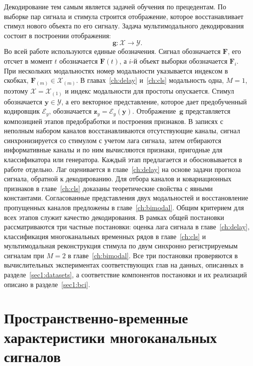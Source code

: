 Декодирование тем самым является задачей обучения по прецедентам. По выборке пар сигнала и стимула строится отображение, которое восстанавливает стимул нового объекта по его сигналу. Задача мультимодального декодирования состоит в построении отображения:
\begin{equation}\label{eq:decoding}
\mathbf{g}: \mathcal{X} \to \mathcal{Y}.
\end{equation}
Во всей работе используются единые обозначения. Сигнал обозначается $\mathbf{F}$, его отсчет в момент $t$ обозначается $\mathbf{F}(t)$, а $i$-й объект выборки обозначается $\mathbf{F}_i$. При нескольких модальностях номер модальности указывается индексом в скобках, $\mathbf{F}_{(m)} \in \mathcal{X}_{(m)}$. В главах~\ref{ch:delay} и~\ref{ch:cls} модальность одна, $M = 1$, поэтому $\mathcal{X} = \mathcal{X}_{(1)}$ и индекс модальности для простоты опускается. Стимул обозначается $\mathbf{y} \in \mathcal{Y}$, а его векторное представление, которое дает предобученный кодировщик $\mathcal{E}_y$, обозначается $\mathbf{z}_y = \mathcal{E}_y(\mathbf{y})$.
Отображение~$\mathbf{g}$ представляется композицией этапов предобработки и построения признаков. В записях с неполным набором каналов восстанавливаются отсутствующие каналы, сигнал синхронизируется со стимулом с учетом лага сигнала, затем отбираются информативные каналы и по ним вычисляются признаки, пригодные для классификатора или генератора. Каждый этап предлагается и обосновывается в работе отдельно. Лаг оценивается в главе~\ref{ch:delay} на основе задачи прогноза сигнала, обратной к декодированию. Для отбора каналов и ковариационных признаков в главе~\ref{ch:cls} доказаны теоретические свойства с явными константами. Согласованные представления двух модальностей и восстановление пропущенных каналов предложены в главе~\ref{ch:bimodal}. Общим критерием для всех этапов служит качество декодирования. В рамках общей постановки рассматриваются три частные постановки: оценка лага сигнала в главе~\ref{ch:delay}, классификация многоканальных временных рядов в главе~\ref{ch:cls} и мультимодальная реконструкция стимула по двум синхронно регистрируемым сигналам при $M = 2$ в главе~\ref{ch:bimodal}. Все три постановки проверяются в вычислительных экспериментах соответствующих глав на данных, описанных в разделе~\ref{sec1:datasets}, а соответствие компонентов постановки и их реализаций описано в разделе~\ref{sec1:bci}.

\section{Пространственно-временные характеристики многоканальных сигналов}\label{sec1:spatiotemporal}

